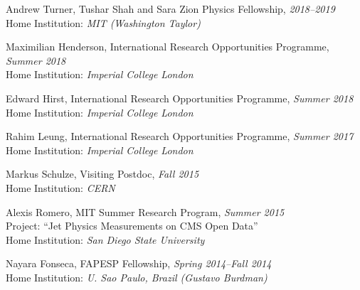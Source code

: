 \item Andrew Turner, Tushar Shah and Sara Zion Physics Fellowship, \emph{2018--2019}
\\ Home Institution: \emph{MIT (Washington Taylor)}

\item Maximilian Henderson, International Research Opportunities Programme, \emph{Summer 2018}
\\ Home Institution: \emph{Imperial College London}

\item Edward Hirst, International Research Opportunities Programme, \emph{Summer 2018}
\\ Home Institution: \emph{Imperial College London}

\item Rahim Leung, International Research Opportunities Programme, \emph{Summer 2017}
\\ Home Institution: \emph{Imperial College London}

\item Markus Schulze, Visiting Postdoc, \emph{Fall 2015}
\\ Home Institution: \emph{CERN}

\item Alexis Romero, MIT Summer Research Program, \emph{Summer 2015}
\\ Project: ``Jet Physics Measurements on CMS Open Data''
\\ Home Institution: \emph{San Diego State University}

\item Nayara Fonseca, FAPESP Fellowship, \emph{Spring 2014--Fall 2014}
\\ Home Institution: \emph{U. Sao Paulo, Brazil (Gustavo Burdman)}

\el
